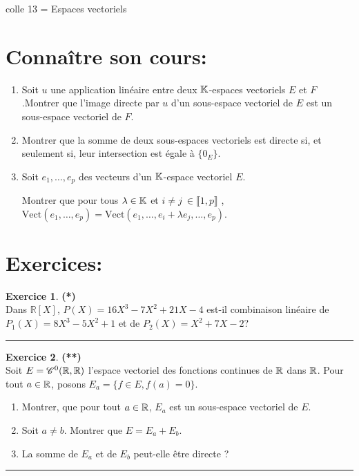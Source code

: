 \documentclass[a4paper,11pt]{article}
\theoremstyle{definition}
\newtheorem{exo}{Exercice} %
\begin{document}
	
	
	\begin{center}
		\Large \sc colle 13 = Espaces vectoriels
	\end{center}
\raggedright

\section*{Connaître son cours:}
\begin{enumerate}
	\item Soit $u$ une application linéaire entre deux $\mathbb{K}$-espaces vectoriels $E$ et $F$.Montrer que l'image directe par $u$ d’un sous-espace vectoriel de $E$ est un sous-espace vectoriel de $F$.
	\item Montrer que la somme de deux sous-espaces vectoriels est directe si, et seulement si, leur intersection est égale à $\{0_E\} $.
	\item Soit $e_1 , \dots , e_p$ des vecteurs d’un $\mathbb{K}$-espace vectoriel $E $. 
	
	Montrer que pour tous $\lambda \in \mathbb{K}$ et $i\neq j \ \in \llbracket1, p\rrbracket$ , $\text{Vect}(e_1 ,\dots , e_p) = \text{Vect}(e_1 ,\dots , e_i + \lambda e_j , \dots, e_p) $.
	
\end{enumerate}

\section*{Exercices:} 	

\begin{exo}\textbf{(*)}\quad\\[0.25cm]
	Dans $\mathbb R[X]$, $P(X)=16X^3-7X^2+21X-4$ est-il combinaison linéaire de $P_1(X)=8X^3-5X^2+1$ et de $P_2(X)=X^2+7X-2$?
	
	\centering
	\rule{1\linewidth}{0.6pt}
\end{exo}
	
\begin{exo}\textbf{(**)}\quad\\[0.25cm]
	Soit $E = \mathscr{C}^0 (\mathbb{R}, \mathbb{R})$ l’espace vectoriel des fonctions continues de $\mathbb{R}$ dans $\mathbb{R}$. Pour tout $a \in \mathbb{R}$, posons $E_a = \{ f \in E , f (a) = 0\}$.
	\begin{enumerate}
		\item Montrer, que pour tout $a \in \mathbb{R}$, $E_a$ est un sous-espace vectoriel de $E $.
		\item Soit $a \neq b $. Montrer que $E = E_a + E_b $.
		\item La somme de $E_a$ et de $E_b$ peut-elle être directe ?
	\end{enumerate}
	
	\centering
	\rule{1\linewidth}{0.6pt}
\end{exo}
\end{document}
